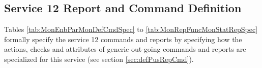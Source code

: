 \documentclass{pnp_article}
\begin{document}
\subsection{Service 12 Report and Command Definition}\label{sec:serv12RepCmdDef}
Tables \ref{tab:MonEnbParMonDefCmdSpec} to \ref{tab:MonRepFuncMonStatRepSpec} formally specify the service 12 commands and reports by specifying how the actions, checks and attributes of generic out-going commands and reports are specialized for this service (see section \ref{sec:defPusRepCmd}). 


\newpage
{}

\newpage
{}

\newpage
{}

\newpage
{}
 
\newpage
{}

\newpage
{}


\newpage
{}

\newpage
{}

\newpage
{}

\newpage
{}

\newpage
{}

\newpage
{}

\newpage
{}

\end{document}
